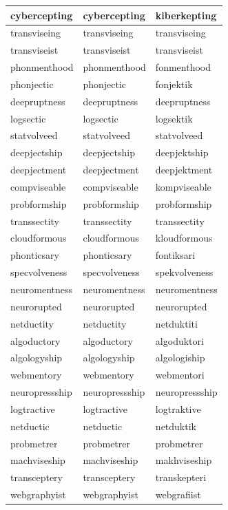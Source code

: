 \documentclass[10pt,twocolumn,letterpaper]{article}
\begin{document}
\begin{longtable}{|p{4cm}|p{4cm}|p{4cm}|}
cybercepting & cybercepting & kiberkepting \\ \hline
transviseing & transviseing & transviseing \\ \hline
transviseist & transviseist & transviseist \\ \hline
phonmenthood & phonmenthood & fonmenthood \\ \hline
phonjectic & phonjectic & fonjektik \\ \hline
deepruptness & deepruptness & deepruptness \\ \hline
logsectic & logsectic & logsektik \\ \hline
statvolveed & statvolveed & statvolveed \\ \hline
deepjectship & deepjectship & deepjektship \\ \hline
deepjectment & deepjectment & deepjektment \\ \hline
compviseable & compviseable & kompviseable \\ \hline
probformship & probformship & probformship \\ \hline
transsectity & transsectity & transsectity \\ \hline
cloudformous & cloudformous & kloudformous \\ \hline
phonticsary & phonticsary & fontiksari \\ \hline
specvolveness & specvolveness & spekvolveness \\ \hline
neuromentness & neuromentness & neuromentness \\ \hline
neurorupted & neurorupted & neurorupted \\ \hline
netductity & netductity & netduktiti \\ \hline
algoductory & algoductory & algoduktori \\ \hline
algologyship & algologyship & algologiship \\ \hline
webmentory & webmentory & webmentori \\ \hline
neuropressship & neuropressship & neuropressship \\ \hline
logtractive & logtractive & logtraktive \\ \hline
netductic & netductic & netduktik \\ \hline
probmetrer & probmetrer & probmetrer \\ \hline
machviseship & machviseship & makhviseship \\ \hline
transceptery & transceptery & transkepteri \\ \hline
webgraphyist & webgraphyist & webgrafiist \\ \hline

\end{longtable}
\end{document}
